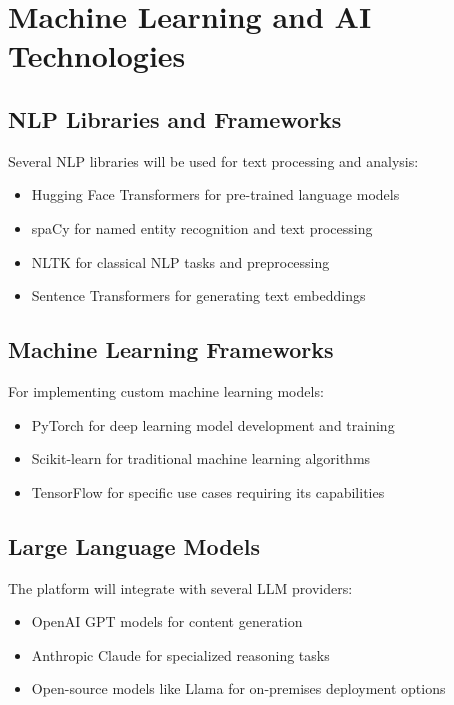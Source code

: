\documentclass[12pt,a4paper]{report}
\begin{document}
\section*{Machine Learning and AI Technologies}

\subsection*{NLP Libraries and Frameworks}

Several NLP libraries will be used for text processing and analysis:
\begin{itemize}
    \item Hugging Face Transformers for pre-trained language models
    \item spaCy for named entity recognition and text processing
    \item NLTK for classical NLP tasks and preprocessing
    \item Sentence Transformers for generating text embeddings
\end{itemize}

\subsection*{Machine Learning Frameworks}

For implementing custom machine learning models:
\begin{itemize}
    \item PyTorch for deep learning model development and training
    \item Scikit-learn for traditional machine learning algorithms
    \item TensorFlow for specific use cases requiring its capabilities
\end{itemize}

\subsection*{Large Language Models}

The platform will integrate with several LLM providers:
\begin{itemize}
    \item OpenAI GPT models for content generation
    \item Anthropic Claude for specialized reasoning tasks
    \item Open-source models like Llama for on-premises deployment options
\end{itemize}
\end{document}
